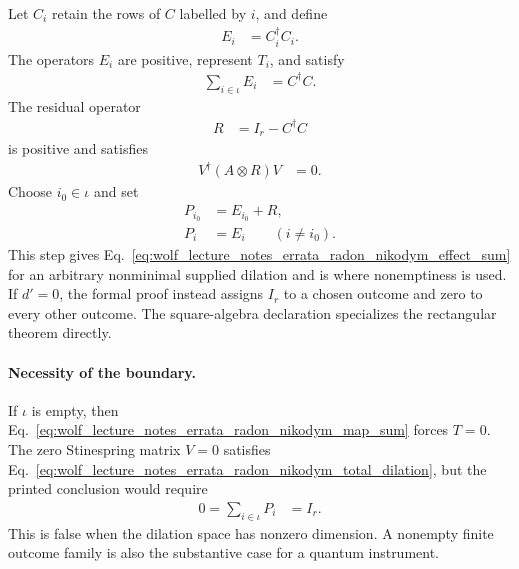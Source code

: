 \documentclass{article}
\begin{document}
Let $C_i$ retain the rows of $C$ labelled by $i$, and define
\begin{align}
    E_i
        &=C_i^\dagger C_i.
    \label{eq:wolf_lecture_notes_errata_radon_nikodym_preliminary_effect}
\end{align}
The operators $E_i$ are positive, represent $T_i$, and satisfy
\begin{align}
    \sum_{i\in\iota}E_i
        &=C^\dagger C.
    \label{eq:wolf_lecture_notes_errata_radon_nikodym_preliminary_sum}
\end{align}
The residual operator
\begin{align}
    R
        &=I_r-C^\dagger C
    \label{eq:wolf_lecture_notes_errata_radon_nikodym_residual_definition}
\end{align}
is positive and satisfies
\begin{align}
    V^\dagger(A\otimes R)V
        &=0.
    \label{eq:wolf_lecture_notes_errata_radon_nikodym_residual_vanishes}
\end{align}
Choose $i_0\in\iota$ and set
\begin{align}
    P_{i_0}
        &=E_{i_0}+R,
    \label{eq:wolf_lecture_notes_errata_radon_nikodym_distinguished_effect}\\
    P_i
        &=E_i\qquad(i\neq i_0).
    \label{eq:wolf_lecture_notes_errata_radon_nikodym_other_effects}
\end{align}
This step gives
Eq.~\ref{eq:wolf_lecture_notes_errata_radon_nikodym_effect_sum} for an
arbitrary nonminimal supplied dilation and is where nonemptiness is used. If
$d'=0$, the formal proof instead assigns $I_r$ to a chosen outcome and zero
to every other outcome. The square-algebra declaration specializes the
rectangular theorem directly.

\paragraph{Necessity of the boundary.}
If $\iota$ is empty, then
Eq.~\ref{eq:wolf_lecture_notes_errata_radon_nikodym_map_sum} forces $T=0$.
The zero Stinespring matrix $V=0$ satisfies
Eq.~\ref{eq:wolf_lecture_notes_errata_radon_nikodym_total_dilation}, but the
printed conclusion would require
\begin{align}
    0
        =\sum_{i\in\iota}P_i
        &=I_r.
    \label{eq:wolf_lecture_notes_errata_radon_nikodym_empty_contradiction}
\end{align}
This is false when the dilation space has nonzero dimension. A nonempty finite
outcome family is also the substantive case for a quantum instrument.
\end{document}
